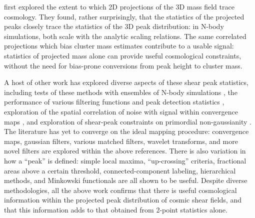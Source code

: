 \documentclass[twocolumn]{emulateapj}
\begin{document}
\citet{Marian09,Marian10} first explored the extent to which 2D 
projections of the
3D mass field trace cosmology.  They found, rather surprisingly, that the
statistics of the projected peaks closely trace the statistics of the 3D
peak distribution: in N-body simulations, both scale 
with the \citet{Sheth99} analytic
scaling relations.  The same correlated projections which bias
cluster mass estimates contribute to a usable signal: 
statistics of projected mass alone can provide useful cosmological 
constraints, without the need for bias-prone conversions from peak 
height to cluster mass.

A host of other work has explored diverse aspects of these
shear peak statistics,
including tests of these methods with ensembles of N-body simulations
\citep{Wang09,Kratochvil10,Dietrich10},
the performance of various filtering functions
and peak detection statistics \citep{Pires09,Schmidt10,Kratochvil11},
exploration of the spatial correlation of noise with signal
within convergence maps \citep{Fan10},
and exploration of shear-peak constraints on primordial non-gaussianity
\citep{Maturi11}.  The literature has yet to converge
on the ideal mapping procedure: convergence maps, gaussian filters,
various matched filters, wavelet transforms, and more novel filters
are explored within the above references.  There is also variation in
how a ``peak'' is defined: simple local maxima, ``up-crossing'' criteria, 
fractional areas above a certain threshold, connected-component labeling, 
hierarchical methods, and Minkowski functionals are all shown to be useful.  
Despite diverse methodologies, all the above work confirms that there 
is useful cosmological information within the projected peak 
distribution of cosmic shear fields, and that this information adds to 
that obtained from 2-point statistics alone.
\end{document}
